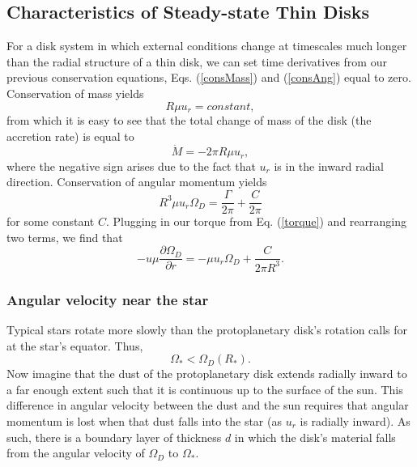 \documentclass[aps,pra,twocolumn]{revtex4-1}
\begin{document}
\subsection{\label{section 2.2} Characteristics of Steady-state Thin Disks}
For a disk system in which external conditions change at timescales much longer than the radial structure of a thin disk, we can set time derivatives from our previous conservation equations, Eqs. (\ref{consMass}) and (\ref{consAng}) equal to zero.  Conservation of mass yields
\begin{equation}
R\mu u_r = constant, \nonumber
\end{equation}
from which it is easy to see that the total change of mass of the disk (the accretion rate) is equal to 
\begin{equation}
\dot{M} = -2\pi R \mu u_r, \label{modifiedMass1}
\end{equation}
where the negative sign arises due to the fact that $u_r$ is in the inward radial direction.  Conservation of angular momentum yields
\begin{equation}
R^3 \mu u_r \Omega_D = \frac{\Gamma}{2\pi} + \frac{C}{2\pi} \nonumber
\end{equation}
for some constant $C$.  Plugging in our torque from Eq. (\ref{torque}) and rearranging two terms, we find that \cite{king2002}
\begin{equation}
- u \mu \frac{\partial \Omega_D}{\partial r} = -\mu u_r \Omega_D  + \frac{C}{2\pi R^3 }. \label{modifiedAng1}
\end{equation}

\subsubsection{\label{section 2.2.1} Angular velocity near the star}
Typical stars rotate more slowly than the protoplanetary disk's rotation calls for at the star's equator.  Thus,
\begin{equation}
\Omega_* < \Omega_D(R_*).
\end{equation}
Now imagine that the dust of the protoplanetary disk extends radially inward to a far enough extent such that it is continuous up to the surface of the sun.  This difference in angular velocity between the dust and the sun requires that angular momentum is lost when that dust falls into the star (as $u_r$ is radially inward).  As such, there is a boundary layer of thickness $d$ in which the disk's material falls from the angular velocity of $\Omega_D$ to $\Omega_*$.  
\end{document}
